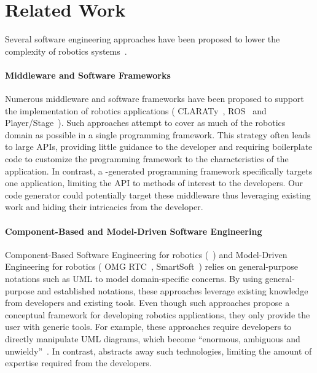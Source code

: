 
\section{Related Work}
\label{sec:related}

Several software engineering approaches have been proposed to lower
the complexity of robotics systems~\cite{Brug07a}.

\paragraph*{Middleware and Software Frameworks}

Numerous middleware and software frameworks have been proposed to
support the implementation of robotics applications (\eg{}
CLARATy~\cite{Claraty}, ROS~\cite{ROS} and
Player/Stage~\cite{Coll05a}). Such approaches attempt to cover as much
of the robotics domain as possible in a single programming framework.
This strategy often leads to large APIs, providing little guidance to
the developer and requiring boilerplate code to customize the
programming framework to the characteristics of the application. In
contrast, a \diaspec{}-generated programming framework specifically
targets one application, limiting the API to methods of interest to
the developers. Our code generator could potentially target these
middleware thus leveraging existing work and hiding their
intricacies from the developer.

\paragraph*{Component-Based and Model-Driven Software Engineering}

Component-Based Software Engineering for robotics
(\eg{}~\cite{Brug07b}) and Model-Driven Engineering for robotics
(\eg{} OMG RTC~\cite{OMGRTC}, SmartSoft~\cite{Schl09a}) relies on
general-purpose notations such as UML to model domain-specific
concerns. By using general-purpose and established notations, these
approaches leverage existing knowledge from developers and existing
tools. Even though such approaches propose a conceptual framework for
developing robotics applications, they only provide the user with
generic tools. For example, these approaches require developers to
directly manipulate UML diagrams, which become ``enormous, ambiguous
and unwieldy''~\cite{Picek08a}. In contrast, \diaspec{} abstracts away
such technologies, limiting the amount of expertise required from the
developers.

